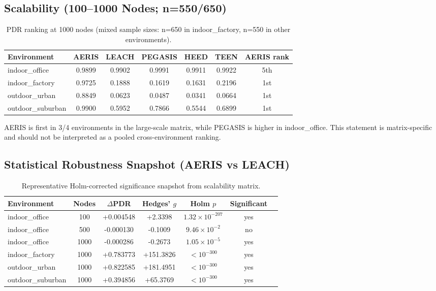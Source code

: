 \documentclass[sensors,article,submit,moreauthors,pdftex]{Definitions/mdpi}
\begin{document}
\subsection{Scalability (100--1000 Nodes; n=550/650)}
\begin{table}[H]
\caption{PDR ranking at 1000 nodes (mixed sample sizes: n=650 in indoor\_factory, n=550 in other environments).}
\label{tab:scale1000}
\centering
\begin{tabular}{lcccccc}
\toprule
Environment & AERIS & LEACH & PEGASIS & HEED & TEEN & AERIS rank \\
\midrule
indoor\_office    & 0.9899 & 0.9902 & 0.9991 & 0.9911 & 0.9922 & 5th \\
indoor\_factory   & 0.9725 & 0.1888 & 0.1619 & 0.1631 & 0.2196 & 1st \\
outdoor\_urban    & 0.8849 & 0.0623 & 0.0487 & 0.0341 & 0.0664 & 1st \\
outdoor\_suburban & 0.9900 & 0.5952 & 0.7866 & 0.5544 & 0.6899 & 1st \\
\bottomrule
\end{tabular}
\end{table}

AERIS is first in 3/4 environments in the large-scale matrix, while PEGASIS is higher in indoor\_office. This statement is matrix-specific and should not be interpreted as a pooled cross-environment ranking.

\subsection{Statistical Robustness Snapshot (AERIS vs LEACH)}
\begin{table}[H]
\caption{Representative Holm-corrected significance snapshot from scalability matrix.}
\label{tab:robust_snapshot}
\centering
\begin{tabular}{lcccccc}
\toprule
Environment & Nodes & $\Delta$PDR & Hedges' $g$ & Holm $p$ & Significant \\
\midrule
indoor\_office    & 100  & +0.004548 & +2.3398 & $1.32\times10^{-207}$ & yes \\
indoor\_office    & 500  & -0.000130 & -0.1009 & $9.46\times10^{-2}$ & no \\
indoor\_office    & 1000 & -0.000286 & -0.2673 & $1.05\times10^{-5}$ & yes \\
indoor\_factory   & 1000 & +0.783773 & +151.3826 & $<10^{-300}$ & yes \\
outdoor\_urban    & 1000 & +0.822585 & +181.4951 & $<10^{-300}$ & yes \\
outdoor\_suburban & 1000 & +0.394856 & +65.3769 & $<10^{-300}$ & yes \\
\bottomrule
\end{tabular}
\end{table}
\end{document}
